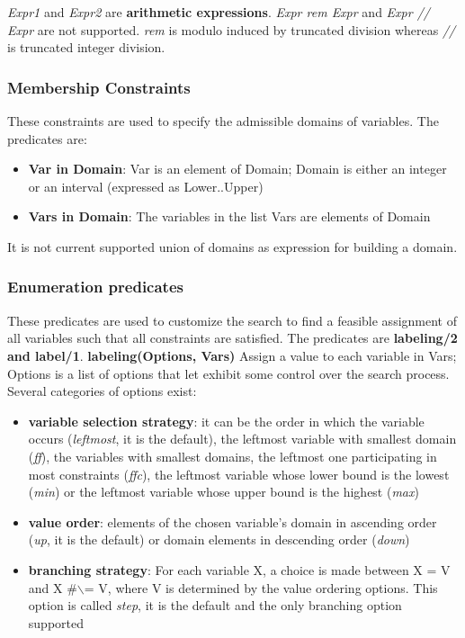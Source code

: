 \textit{Expr1} and \textit{Expr2} are \textbf{arithmetic expressions}.
\textit{Expr rem Expr} and \textit{Expr // Expr} are not supported. \textit{rem} is modulo induced by truncated division
whereas \textit{//} is truncated integer division.

\subsubsection{Membership Constraints}\label{subsubsec:Membership}

These constraints are used to specify the admissible domains of variables.\newline
The predicates are:\newline
\begin{itemize}
    \item \textbf{Var in Domain}: Var is an element of Domain; Domain is either an integer or an interval (expressed as Lower..Upper)
    \item \textbf{Vars in Domain}: The variables in the list Vars are elements of Domain
\end{itemize}

It is not current supported union of domains as expression for building a domain.

\subsubsection{Enumeration predicates}\label{subsubsec:enumeration}

These predicates are used to customize the search to find a feasible assignment of all variables such that all constraints are satisfied.\newline
The predicates are \textbf{labeling/2 and label/1}.\newline\newline
\textbf{labeling(Options, Vars)}\newline\newline
Assign a value to each variable in Vars; Options is a list of options that let exhibit some control over the search process. Several categories of options exist:
\begin{itemize}
    \item \textbf{variable selection strategy}: it can be the order in which the variable occurs (\textit{leftmost}, it is the default), the leftmost variable with smallest domain (\textit{ff}), the variables with smallest domains, the leftmost one participating in most constraints (\textit{ffc}), the leftmost variable whose lower bound is the lowest (\textit{min}) or the leftmost variable whose upper bound is the highest (\textit{max})
    \item \textbf{value order}: elements of the chosen variable's domain in ascending order (\textit{up}, it is the default) or domain elements in descending order (\textit{down})
    \item \textbf{branching strategy}: For each variable X, a choice is made between X = V and X \#$\backslash$= V, where V is determined by the value ordering options. This option is called \textit{step}, it is the default and the only branching option supported
\end{itemize}

